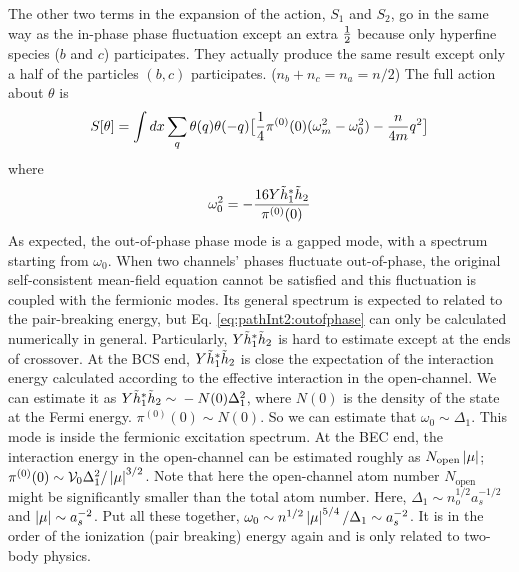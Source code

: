 The other two terms in the expansion of the action, $S_{1}$ and $S_{2}$, go in the same way as the in-phase phase fluctuation except an extra  $\frac{1}{2}$ because only hyperfine species ($b$ and $c$) participates.  They actually produce the same result except only a half of the particles $(b,c)$ participates. ($n_{b}+n_{c}=n_{a}=n/2$)   The full action about $\theta$ is 
\begin{equation}\label{eq:pathInt2:outofphase}
S[\theta]=\int{dx}\sum_{q}\theta(q)\theta(-q)\big[\frac{1}{4}\pi^{(0)}(0)(\omega_m^2-\omega_{0}^{2})-\frac{n}{4m}q^2\big]
\end{equation}
where
\begin{equation}
\omega_{0}^{2}=-\frac{16Y\tilde{h}_{1}^{*}\tilde{h}_{2}}{\pi^{(0)}(0)}
\end{equation}
As expected, the out-of-phase phase mode is a gapped mode, with a spectrum starting from $\omega_{0}$. When two channels' phases fluctuate out-of-phase, the original self-consistent mean-field equation cannot be satisfied and this fluctuation is coupled with the fermionic modes.  Its general spectrum is expected to related to the pair-breaking energy, but Eq. \ref{eq:pathInt2:outofphase} can only be calculated numerically in general.  Particularly, $Y\tilde{h}_{1}^{*}\tilde{h}_{2}$ is hard to estimate except at the ends of crossover. At the BCS end, $Y\tilde{h}_{1}^{*}\tilde{h}_{2}$ is close the expectation of the interaction energy calculated according to the effective interaction in the open-channel.  We can estimate it as $Y\tilde{h}_{1}^{*}\tilde{h}_{2}\sim{}-N(0)\Delta_{1}^{2}$, where $N(0)$ is the density of the state at the Fermi energy.  $\pi^{(0)}(0)\sim{}N(0)$.  So we can estimate that $\omega_{0}\sim\Delta_{1}$.  This mode is inside the fermionic excitation spectrum.  At the BEC end, the interaction energy in the open-channel can be estimated roughly as $N_{\text{open}}\left\lvert{\mu}\right\rvert$; $\pi^{(0)}(0)\sim{}\mathcal{V}_{0}\Delta_{1}^{2}/\left\lvert{\mu}\right\rvert^{3/2}$. Note that here the open-channel atom number $N_{\text{open}}$ might be significantly smaller than the total atom number. Here, $\Delta_{1}\sim{}n_{o}^{1/2}a_{s}^{-1/2}$ and $\left\lvert{\mu}\right\rvert\sim{}a_{s}^{-2}$.  Put all these together, $\omega_{0}\sim{}n^{1/2}\left\lvert{\mu}\right\rvert^{5/4}/\Delta_{1}\sim{}a_{s}^{-2}$. It is in the order of the ionization (pair breaking) energy again and is only related to two-body physics.   
%






